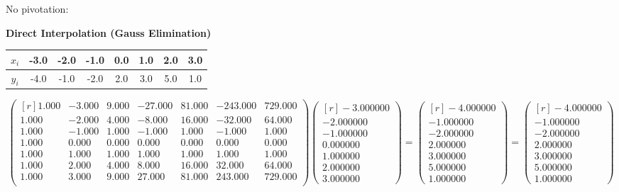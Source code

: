 \documentclass{report}[10pts]
\begin{document}
No pivotation:
   \begin{center}
   \textbf{\Large{Direct Interpolation (Gauss Elimination)}}
   \end{center}
\begin{center}\begin{tabular}{|c|c|c|c|c|c|c|c|}
   \hline
   $x_i$ & -3.0 & -2.0 & -1.0 & 0.0 & 1.0 & 2.0 & 3.0\\
   \hline
   $y_i$ & -4.0 & -1.0 & -2.0 & 2.0 & 3.0 & 5.0 & 1.0\\
   \hline
\end{tabular}\end{center}

\[
      \begin{pmatrix*}[r]
         1.000 & -3.000 & 9.000 & -27.000 & 81.000 & -243.000 & 729.000\\
         1.000 & -2.000 & 4.000 & -8.000 & 16.000 & -32.000 & 64.000\\
         1.000 & -1.000 & 1.000 & -1.000 & 1.000 & -1.000 & 1.000\\
         1.000 & 0.000 & 0.000 & 0.000 & 0.000 & 0.000 & 0.000\\
         1.000 & 1.000 & 1.000 & 1.000 & 1.000 & 1.000 & 1.000\\
         1.000 & 2.000 & 4.000 & 8.000 & 16.000 & 32.000 & 64.000\\
         1.000 & 3.000 & 9.000 & 27.000 & 81.000 & 243.000 & 729.000\\
      \end{pmatrix*}
      \begin{pmatrix*}[r]
      -3.000000 \\ -2.000000 \\ -1.000000 \\ 0.000000 \\ 1.000000 \\ 2.000000 \\ 3.000000
      \end{pmatrix*}
   =
      \begin{pmatrix*}[r]
      -4.000000 \\ -1.000000 \\ -2.000000 \\ 2.000000 \\ 3.000000 \\ 5.000000 \\ 1.000000
      \end{pmatrix*}
   =
      \begin{pmatrix*}[r]
      -4.000000 \\ -1.000000 \\ -2.000000 \\ 2.000000 \\ 3.000000 \\ 5.000000 \\ 1.000000
      \end{pmatrix*}
\]
\end{document}
